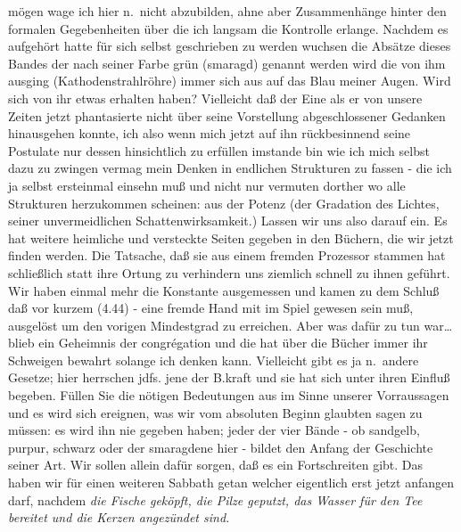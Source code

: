 \documentclass[
]{article}
\begin{document}
mögen wage ich hier n.~nicht abzubilden, ahne aber Zusammenhänge hinter
den formalen Gegebenheiten über die ich langsam die Kontrolle erlange.
Nachdem es aufgehört hatte für sich selbst geschrieben zu werden wuchsen
die Absätze dieses Bandes der nach seiner Farbe grün (smaragd) genannt
werden wird die von ihm ausging (Kathodenstrahlröhre) immer sich aus auf
das Blau meiner Augen. Wird sich von ihr etwas erhalten haben?
Vielleicht daß der Eine als er von unsere Zeiten jetzt phantasierte
nicht über seine Vorstellung abgeschlossener Gedanken hinausgehen
konnte, ich also wenn mich jetzt auf ihn rückbesinnend seine Postulate
nur dessen hinsichtlich zu erfüllen imstande bin wie ich mich selbst
dazu zu zwingen vermag mein Denken in endlichen Strukturen zu fassen -
die ich ja selbst ersteinmal einsehn muß und nicht nur vermuten dorther
wo alle Strukturen herzukommen scheinen: aus der Potenz (der Gradation
des Lichtes, seiner unvermeidlichen Schattenwirksamkeit.) Lassen wir uns
also darauf ein. Es hat weitere heimliche und versteckte Seiten gegeben
in den Büchern, die wir jetzt finden werden. Die Tatsache, daß sie aus
einem fremden Prozessor stammen hat schließlich statt ihre Ortung zu
verhindern uns ziemlich schnell zu ihnen geführt. Wir haben einmal mehr
die Konstante ausgemessen und kamen zu dem Schluß daß vor kurzem (4.44)
- eine fremde Hand mit im Spiel gewesen sein muß, ausgelöst um den
vorigen Mindestgrad zu erreichen. Aber was dafür zu tun war\ldots{}
blieb ein Geheimnis der congrégation und die hat über die Bücher immer
ihr Schweigen bewahrt solange ich denken kann. Vielleicht gibt es ja
n.~andere Gesetze; hier herrschen jdfs. jene der B.kraft und sie hat
sich unter ihren Einfluß begeben. Füllen Sie die nötigen Bedeutungen aus
im Sinne unserer Vorraussagen und es wird sich ereignen, was wir vom
absoluten Beginn glaubten sagen zu müssen: es wird ihn nie gegeben
haben; jeder der vier Bände - ob sandgelb, purpur, schwarz oder der
smaragdene hier - bildet den Anfang der Geschichte seiner Art. Wir
sollen allein dafür sorgen, daß es ein Fortschreiten gibt. Das haben wir
für einen weiteren Sabbath getan welcher eigentlich erst jetzt anfangen
darf, nachdem \emph{die Fische geköpft, die Pilze geputzt, das Wasser
für den Tee bereitet und die Kerzen angezündet sind.}
\end{document}
